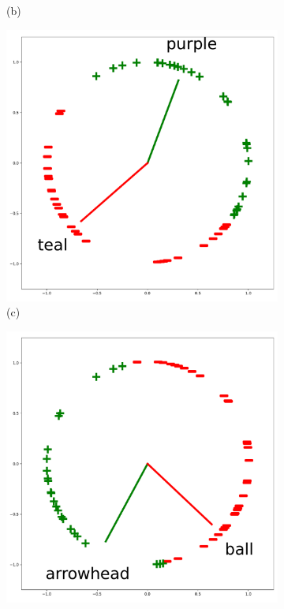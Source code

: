 \begin{figure}[h]
{\begin{subfigure}{0.25\textwidth}
    \caption*{(b)}
  \end{subfigure}%
  \hspace*{\fill}   %
  \begin{subfigure}{0.25\textwidth}
    \includegraphics[width=\linewidth]{figures/vision_and_language/clip_clocks/purple_teal.pdf}
    \caption*{(c)}
  \end{subfigure}%
  \hspace*{\fill}   %
  \begin{subfigure}{0.25\textwidth}
    \includegraphics[width=\linewidth]{figures/vision_and_language/clip_clocks/arrowhead_ball.pdf}

\end{subfigure}}
\end{figure}
